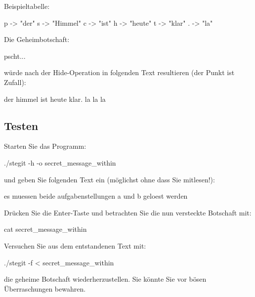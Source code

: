 Beispieltabelle:

\begin{osuefmtcode}
p -> "der"
s -> "Himmel"
c -> "ist"
h -> "heute"
t -> "klar"
. -> "la"
\end{osuefmtcode}

Die Geheimbotschaft:

\begin{osuefmtcode}
pscht...
\end{osuefmtcode}

würde nach der Hide-Operation in folgenden Text resultieren (der Punkt ist
Zufall):

\begin{osuefmtcode}
der himmel ist heute klar. la la la
\end{osuefmtcode}

\subsection*{Testen}

Starten Sie das Programm:

\begin{osuefmtcode}
./stegit -h -o secret_message_within
\end{osuefmtcode}

und geben Sie folgenden Text ein (möglichst ohne dass Sie mitlesen!):

\begin{osuefmtcode}
es muessen beide aufgabenstellungen a und b geloest werden
\end{osuefmtcode}

Drücken Sie die Enter-Taste und betrachten Sie die nun versteckte Botschaft mit:

\begin{osuefmtcode}
cat secret_message_within
\end{osuefmtcode}

Versuchen Sie aus dem entstandenen Text mit:

\begin{osuefmtcode}
./stegit -f < secret_message_within
\end{osuefmtcode}

die geheime Botschaft wiederherzustellen. Sie könnte Sie vor bösen
Überraschungen bewahren.

\osueguidelinesone


